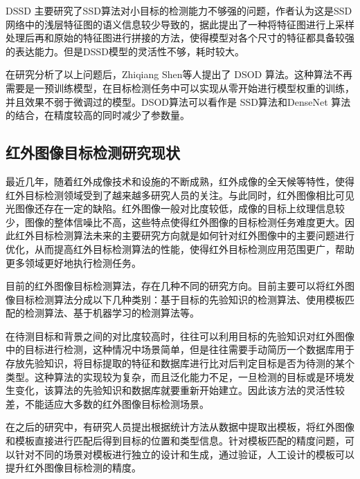 DSSD 主要研究了SSD算法对小目标的检测能力不够强的问题，作者认为这是SSD网络中的浅层特征图的语义信息较少导致的，据此提出了一种将特征图进行上采样处理后再和原始的特征图进行拼接的方法，使得模型对各个尺寸的特征都具备较强的表达能力。但是DSSD模型的灵活性不够，耗时较大。

在研究分析了以上问题后，Zhiqiang Shen等人提出了 DSOD 算法。这种算法不再需要是一预训练模型，在目标检测任务中可以实现从零开始进行模型权重的训练，并且效果不弱于微调过的模型。DSOD算法可以看作是 SSD算法和DenseNet 算法的结合，在精度较高的同时减少了参数量。

\subsection{红外图像目标检测研究现状}
最近几年，随着红外成像技术和设施的不断成熟，红外成像的全天候等特性，使得红外目标检测领域受到了越来越多研究人员的关注。与此同时，红外图像相比可见光图像还存在一定的缺陷。红外图像一般对比度较低，成像的目标上纹理信息较少，图像的整体信噪比不高，这些特点使得红外图像的目标检测任务难度更大。因此红外目标检测算法未来的主要研究方向就是如何针对红外图像中的主要问题进行优化，从而提高红外目标检测算法的性能，使得红外目标检测应用范围更广，帮助更多领域更好地执行检测任务。

目前的红外图像目标检测算法，存在几种不同的研究方向。目前主要可以将红外图像目标检测算法分成以下几种类别：基于目标的先验知识的检测算法、使用模板匹配的检测算法、基于机器学习的检测算法等。

在待测目标和背景之间的对比度较高时，往往可以利用目标的先验知识对红外图像中的目标进行检测，这种情况中场景简单，但是往往需要手动简历一个数据库用于存放先验知识，将目标提取的特征和数据库进行比对后判定目标是否为待测的某个类型。这种算法的实现较为复杂，而且泛化能力不足，一旦检测的目标或是环境发生变化，该算法的先验知识和数据库就要重新开始建立。因此该方法的灵活性较差，不能适应大多数的红外图像目标检测场景。

在之后的研究中，有研究人员提出根据统计方法从数据中提取出模板，将红外图像和模板直接进行匹配后得到目标的位置和类型信息\cite{宋曦2010一种基于模板匹配的目标识别方法}。针对模板匹配的精度问题，可以针对不同的场景对模板进行独立的设计和生成，通过验证，人工设计的模板可以提升红外图像目标检测的精度。

